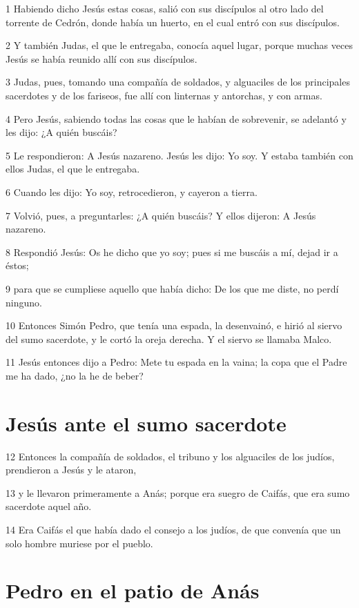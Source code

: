 \par 1 Habiendo dicho Jesús estas cosas, salió con sus discípulos al otro lado del torrente de Cedrón, donde había un huerto, en el cual entró con sus discípulos.
\par 2 Y también Judas, el que le entregaba, conocía aquel lugar, porque muchas veces Jesús se había reunido allí con sus discípulos.
\par 3 Judas, pues, tomando una compañía de soldados, y alguaciles de los principales sacerdotes y de los fariseos, fue allí con linternas y antorchas, y con armas.
\par 4 Pero Jesús, sabiendo todas las cosas que le habían de sobrevenir, se adelantó y les dijo: ¿A quién buscáis?
\par 5 Le respondieron: A Jesús nazareno. Jesús les dijo: Yo soy. Y estaba también con ellos Judas, el que le entregaba.
\par 6 Cuando les dijo: Yo soy, retrocedieron, y cayeron a tierra.
\par 7 Volvió, pues, a preguntarles: ¿A quién buscáis? Y ellos dijeron: A Jesús nazareno.
\par 8 Respondió Jesús: Os he dicho que yo soy; pues si me buscáis a mí, dejad ir a éstos;
\par 9 para que se cumpliese aquello que había dicho: De los que me diste, no perdí ninguno.
\par 10 Entonces Simón Pedro, que tenía una espada, la desenvainó, e hirió al siervo del sumo sacerdote, y le cortó la oreja derecha. Y el siervo se llamaba Malco.
\par 11 Jesús entonces dijo a Pedro: Mete tu espada en la vaina; la copa que el Padre me ha dado, ¿no la he de beber?

\section*{Jesús ante el sumo sacerdote}

\par 12 Entonces la compañía de soldados, el tribuno y los alguaciles de los judíos, prendieron a Jesús y le ataron,
\par 13 y le llevaron primeramente a Anás; porque era suegro de Caifás, que era sumo sacerdote aquel año.
\par 14 Era Caifás el que había dado el consejo a los judíos, de que convenía que un solo hombre muriese por el pueblo.

\section*{Pedro en el patio de Anás}


